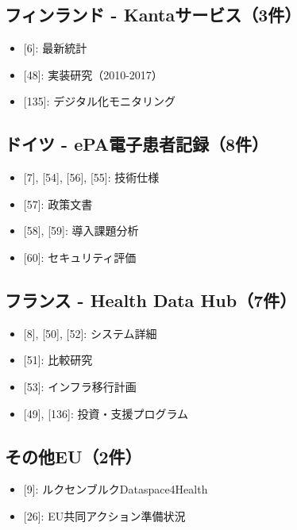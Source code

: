 \documentclass[
  a4paper,
  a4paper,
  11pt]{ltjsbook}
\providecommand{\tightlist}{%
  \setlength{\itemsep}{0pt}\setlength{\parskip}{0pt}}
\begin{document}
\subsection{フィンランド -
Kantaサービス（3件）}\label{ux30d5ux30a3ux30f3ux30e9ux30f3ux30c9---kantaux30b5ux30fcux30d3ux30b93ux4ef6}

\begin{itemize}
\tightlist
\item
  {[}6{]}: 最新統計
\item
  {[}48{]}: 実装研究（2010-2017）
\item
  {[}135{]}: デジタル化モニタリング
\end{itemize}

\subsection{ドイツ -
ePA電子患者記録（8件）}\label{ux30c9ux30a4ux30c4---epaux96fbux5b50ux60a3ux8005ux8a18ux93328ux4ef6}

\begin{itemize}
\tightlist
\item
  {[}7{]}, {[}54{]}, {[}56{]}, {[}55{]}: 技術仕様
\item
  {[}57{]}: 政策文書
\item
  {[}58{]}, {[}59{]}: 導入課題分析
\item
  {[}60{]}: セキュリティ評価
\end{itemize}

\subsection{フランス - Health Data
Hub（7件）}\label{ux30d5ux30e9ux30f3ux30b9---health-data-hub7ux4ef6}

\begin{itemize}
\tightlist
\item
  {[}8{]}, {[}50{]}, {[}52{]}: システム詳細
\item
  {[}51{]}: 比較研究
\item
  {[}53{]}: インフラ移行計画
\item
  {[}49{]}, {[}136{]}: 投資・支援プログラム
\end{itemize}

\subsection{その他EU（2件）}\label{ux305dux306eux4ed6eu2ux4ef6}

\begin{itemize}
\tightlist
\item
  {[}9{]}: ルクセンブルクDataspace4Health
\item
  {[}26{]}: EU共同アクション準備状況
\end{itemize}
\end{document}
